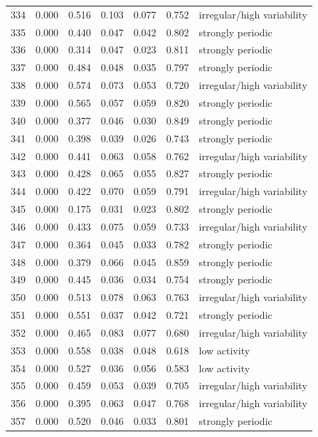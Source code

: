 \begin{longtable}{lrrrrrl}
334 & 0.000 & 0.516 & 0.103 & 0.077 & 0.752 & irregular/high variability \\
335 & 0.000 & 0.440 & 0.047 & 0.042 & 0.802 & strongly periodic \\
336 & 0.000 & 0.314 & 0.047 & 0.023 & 0.811 & strongly periodic \\
337 & 0.000 & 0.484 & 0.048 & 0.035 & 0.797 & strongly periodic \\
338 & 0.000 & 0.574 & 0.073 & 0.053 & 0.720 & irregular/high variability \\
339 & 0.000 & 0.565 & 0.057 & 0.059 & 0.820 & strongly periodic \\
340 & 0.000 & 0.377 & 0.046 & 0.030 & 0.849 & strongly periodic \\
341 & 0.000 & 0.398 & 0.039 & 0.026 & 0.743 & strongly periodic \\
342 & 0.000 & 0.441 & 0.063 & 0.058 & 0.762 & irregular/high variability \\
343 & 0.000 & 0.428 & 0.065 & 0.055 & 0.827 & strongly periodic \\
344 & 0.000 & 0.422 & 0.070 & 0.059 & 0.791 & irregular/high variability \\
345 & 0.000 & 0.175 & 0.031 & 0.023 & 0.802 & strongly periodic \\
346 & 0.000 & 0.433 & 0.075 & 0.059 & 0.733 & irregular/high variability \\
347 & 0.000 & 0.364 & 0.045 & 0.033 & 0.782 & strongly periodic \\
348 & 0.000 & 0.379 & 0.066 & 0.045 & 0.859 & strongly periodic \\
349 & 0.000 & 0.445 & 0.036 & 0.034 & 0.754 & strongly periodic \\
350 & 0.000 & 0.513 & 0.078 & 0.063 & 0.763 & irregular/high variability \\
351 & 0.000 & 0.551 & 0.037 & 0.042 & 0.721 & strongly periodic \\
352 & 0.000 & 0.465 & 0.083 & 0.077 & 0.680 & irregular/high variability \\
353 & 0.000 & 0.558 & 0.038 & 0.048 & 0.618 & low activity \\
354 & 0.000 & 0.527 & 0.036 & 0.056 & 0.583 & low activity \\
355 & 0.000 & 0.459 & 0.053 & 0.039 & 0.705 & irregular/high variability \\
356 & 0.000 & 0.395 & 0.063 & 0.047 & 0.768 & irregular/high variability \\
357 & 0.000 & 0.520 & 0.046 & 0.033 & 0.801 & strongly periodic \\

\end{longtable}
